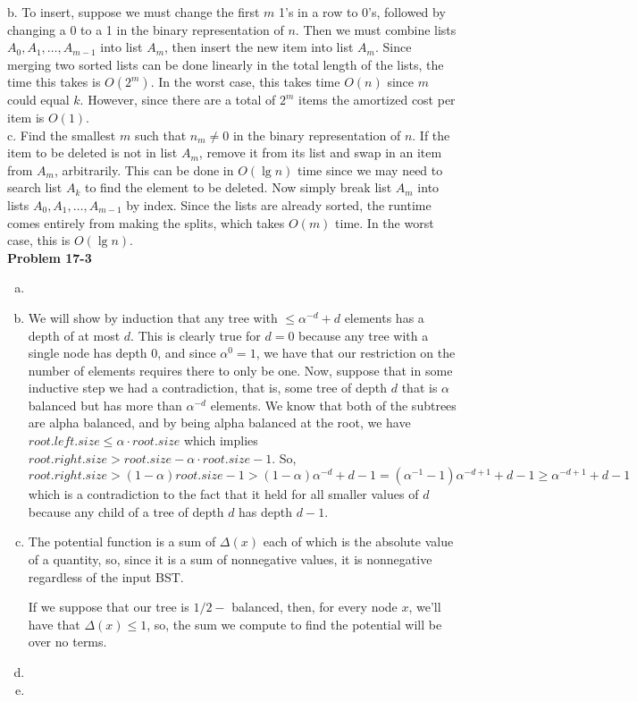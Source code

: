 \documentclass{article}
\begin{document}
b. To insert, suppose we must change the first $m$ 1's in a row to 0's, followed by changing a 0 to a 1 in the binary representation of $n$.  Then we must combine lists $A_0, A_1, \ldots, A_{m-1}$ into list $A_m$, then insert the new item into list $A_m$.  Since merging two sorted lists can be done linearly in the total length of the lists, the time this takes is $O(2^m)$.  In the worst case, this takes time $O(n)$ since $m$ could equal $k$.  However, since there are a total of $2^m$ items the amortized cost per item is $O(1)$. \\

c. Find the smallest $m$ such that $n_m \neq 0$ in the binary representation of $n$.  If the item to be deleted is not in list $A_m$, remove it from its list and swap in an item from $A_m$, arbitrarily.  This can be done in $O(\lg n)$ time since we may need to search list $A_k$ to find the element to be deleted.  Now simply break list $A_m$ into lists $A_0, A_1, \ldots, A_{m-1}$ by index.  Since the lists are already sorted, the runtime comes entirely from making the splits, which takes $O(m)$ time.  In the worst case, this is $O(\lg n)$. \\

\noindent\textbf{Problem 17-3}\\

\begin{enumerate}[a.]%
\item

\item
We will show by induction that any tree with $\le \alpha^{-d}+d$ elements has a depth of at most $d$. This is clearly true for $d=0$ because any tree with a single node has depth 0, and since $\alpha^0 = 1$, we have that our restriction on the number of elements requires there to only be one. Now, suppose that in some inductive step we had a contradiction, that is, some tree of depth $d$ that is $\alpha$ balanced but has more than $\alpha^{-d}$ elements. We know that both of the subtrees are alpha balanced, and by being alpha balanced at the root, we have $root.left.size \le \alpha \cdot root.size$ which implies $root.right.size > root.size - \alpha \cdot root.size -1$. So, $root.right.size > (1-\alpha) root.size -1 > (1-\alpha) \alpha^{-d} + d-1 = (\alpha^{-1} -1)\alpha^{-d+1} + d-1 \ge \alpha^{-d+1}+d-1$ which is a contradiction to the fact that it held for all smaller values of $d$ because any child of a tree of depth $d$ has depth $d-1$.  
 \item
The potential function is a sum of $\Delta(x)$ each of which is the absolute value of a quantity, so, since it is a sum of nonnegative values, it is nonnegative regardless of the input BST.

If we suppose that our tree is $1/2-$ balanced, then, for every node $x$, we'll have that $\Delta(x) \le 1$, so, the sum we compute to find the potential will be over no terms.
 
 \item
 
 
 \item
 
\end{enumerate}
\end{document}
